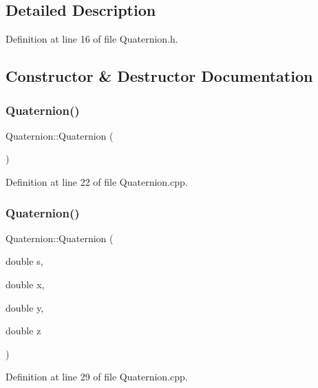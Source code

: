 \subsection{Detailed Description}


Definition at line 16 of file Quaternion.\+h.



\subsection{Constructor \& Destructor Documentation}
\mbox{\label{class_quaternion_abcc01358aada56ea5f0db4da18aaf77d}} 
\subsubsection{\texorpdfstring{Quaternion()}{Quaternion()}\hspace{0.1cm}{\footnotesize\ttfamily [1/3]}}
{\footnotesize\ttfamily Quaternion\+::\+Quaternion (\begin{DoxyParamCaption}{ }\end{DoxyParamCaption})}



Definition at line 22 of file Quaternion.\+cpp.

\mbox{\label{class_quaternion_acfe8dedd6463d94520dc654f4879efcc}} 
\subsubsection{\texorpdfstring{Quaternion()}{Quaternion()}\hspace{0.1cm}{\footnotesize\ttfamily [2/3]}}
{\footnotesize\ttfamily Quaternion\+::\+Quaternion (\begin{DoxyParamCaption}\item[{double}]{s,  }\item[{double}]{x,  }\item[{double}]{y,  }\item[{double}]{z }\end{DoxyParamCaption})}



Definition at line 29 of file Quaternion.\+cpp.

